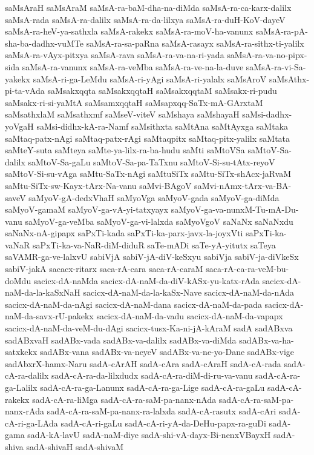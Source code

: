 {saMsAraH
saMsAraM
saMsA-ra-baM-dha-na-diMda
saMsA-ra-ca-karx-dalilx
saMsA-rada
saMsA-ra-dalilx
saMsA-ra-da-lilxya
saMsA-ra-duH-KoV-dayeV
saMsA-ra-heV-ya-sathxla
saMsA-rakekx
saMsA-ra-moV-ha-vanunx
saMsA-ra-pA-sha-ba-dadhx-vuMTe
saMsA-ra-sa-paRna
saMsA-rasayx
saMsA-ra-sithx-ti-yalilx
saMsA-ra-vAyx-pitxya
saMsA-rava
saMsA-ra-va-na-ri-yada
saMsA-ra-va-no-pipx-sida
saMsA-ra-vanunx
saMsA-ra-veMba
saMsA-ra-ve-na-la-duve
saMsA-ra-vi-Sa-yakekx
saMsA-ri-ga-LeMdu
saMsA-ri-yAgi
saMsA-ri-yalalx
saMsAroV
saMsAthx-pi-ta-vAda
saMsakxqqta
saMsakxqqtaH
saMsakxqqtaM
saMsakx-ri-pudu
saMsakx-ri-si-yaMtA
saMsamxqqtaH
saMsapxqq-SaTx-mA-GArxtaM
saMsathxlaM
saMsathxmf
saMseV-viteV
saMshaya
saMshayaH
saMsi-dadhx-yoVgaH
saMsi-didhx-kA-ra-Namf
saMsithxta
saMtAna
saMtAyxga
saMtaka
saMtaq-patx-nAgi
saMtaq-patx-rAgi
saMtaqpitx
saMtaq-pitx-yalilx
saMtata
saMteY-suta
saMteya
saMte-ya-lilx-ra-ba-hudu
saMti
saMtoVSa
saMtoV-Sa-dalilx
saMtoV-Sa-gaLu
saMtoV-Sa-pa-TaTxnu
saMtoV-Si-su-tAtx-reyoV
saMtoV-Si-su-vAga
saMtu-SaTx-nAgi
saMtuSiTx
saMtu-SiTx-shAcx-jaRvaM
saMtu-SiTx-sw-Kayx-tArx-Na-vanu
saMvi-BAgoV
saMvi-nAmx-tArx-va-BA-saveV
saMyoV-gA-dedxVhaH
saMyoVga
saMyoV-gada
saMyoV-ga-diMda
saMyoV-gamaM
saMyoV-ga-vA-yi-tatxyayx
saMyoV-ga-va-nunxM-Tu-mA-Du-vanu
saMyoV-ga-veMba
saMyoV-ga-vi-lalxda
saMyoVgoV
saNaNx
saNaNxdu
saNaNx-nA-gipapx
saPxTi-kada
saPxTi-ka-parx-javx-la-joyxVti
saPxTi-ka-vaNaR
saPxTi-ka-va-NaR-diM-diduR
saTe-mADi
saTe-yA-yitutx
saTeya
saVAMR-ga-ve-lalxvU
sabiVjA
sabiV-jA-diV-keSxyu
sabiVja
sabiV-ja-diVkeSx
sabiV-jakA
sacacx-ritarx
saca-rA-cara
saca-rA-caraM
saca-rA-ca-ra-veM-bu-doMdu
sacicx-dA-naMda
sacicx-dA-naM-da-diV-kASx-yu-katx-rAda
sacicx-dA-naM-da-la-kaSxNaH
sacicx-dA-naM-da-la-kaSx-Nave
sacicx-dA-naM-da-nAda
sacicx-dA-naM-da-nAgi
sacicx-dA-naM-dana
sacicx-dA-naM-da-pada
sacicx-dA-naM-da-savx-rU-pakekx
sacicx-dA-naM-da-vadu
sacicx-dA-naM-da-vapapx
sacicx-dA-naM-da-veM-du-dAgi
sacicx-tusx-Ka-ni-jA-kAraM
sadA
sadABxva
sadABxvaH
sadABx-vada
sadABx-va-dalilx
sadABx-va-diMda
sadABx-va-ha-satxkekx
sadABx-vana
sadABx-va-neyeV
sadABx-va-ne-yo-Dane
sadABx-vige
sadAbxrX-hamx-Naru
sadA-cArAH
sadA-cAra
sadA-cAraH
sadA-cA-rada
sadA-cA-ra-dalilx
sadA-cA-ra-da-lilxdudx
sadA-cA-ra-diM-di-ru-va-vanu
sadA-cA-ra-ga-Lalilx
sadA-cA-ra-ga-Lanunx
sadA-cA-ra-ga-Lige
sadA-cA-ra-gaLu
sadA-cA-rakekx
sadA-cA-ra-liMga
sadA-cA-ra-saM-pa-nanx-nAda
sadA-cA-ra-saM-pa-nanx-rAda
sadA-cA-ra-saM-pa-nanx-ra-lalxda
sadA-cA-rasutx
sadA-cAri
sadA-cA-ri-ga-LAda
sadA-cA-ri-gaLu
sadA-cA-ri-yA-da-DeHu-papx-ra-guDi
sadA-gama
sadA-kA-lavU
sadA-naM-diye
sadA-shi-vA-dayx-Bi-nenxVBayxH
sadA-shiva
sadA-shivaH
sadA-shivaM
}
